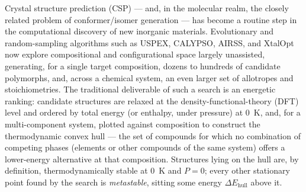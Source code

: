 \documentclass[journal=jpccck,manuscript=article]{achemso}
\begin{document}
Crystal structure prediction (CSP) --- and, in the molecular realm, the
closely related problem of conformer/isomer generation --- has become a
routine step in the computational discovery of new inorganic materials.
Evolutionary and random-sampling algorithms such as USPEX,\cite{oganov2006}
CALYPSO,\cite{wang2012} AIRSS,\cite{pickard2011} and XtalOpt\cite{zurek2021}
now explore compositional and configurational space largely unassisted,
generating, for a single target composition, dozens to hundreds of candidate
polymorphs, and, across a chemical system, an even larger set of
allotropes and stoichiometries.\cite{oganov2019} The traditional deliverable
of such a search is an energetic ranking: candidate structures are relaxed
at the density-functional-theory (DFT) level and ordered by total energy (or
enthalpy, under pressure) at 0~K, and, for a multi-component system, plotted
against composition to construct the thermodynamic convex hull --- the set of
compounds for which no combination of competing phases (elements or other
compounds of the same system) offers a lower-energy alternative at that
composition.\cite{ong2008,jain2013} Structures lying on the hull are, by
definition, thermodynamically stable at 0~K and $P=0$; every other stationary
point found by the search is \emph{metastable}, sitting some energy
$\Delta E_\text{hull}$ above it.
\end{document}
